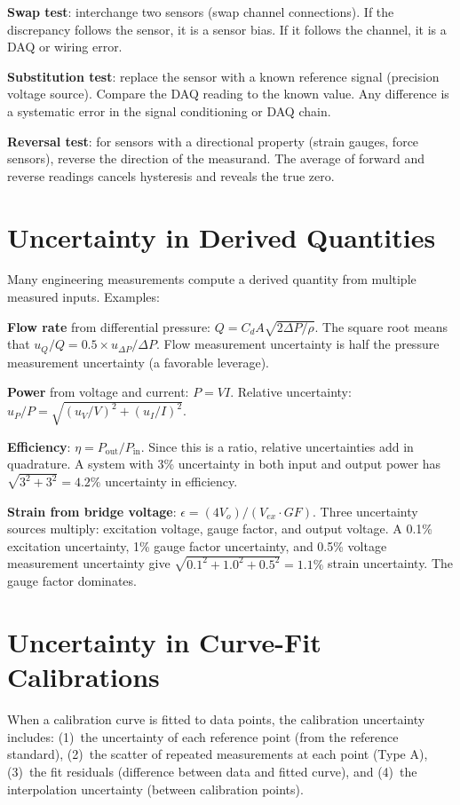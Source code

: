 \documentclass[11pt,letterpaper,twoside,openany]{book}
\begin{document}
\textbf{Swap test}: interchange two sensors (swap channel connections). If the discrepancy follows the sensor, it is a sensor bias. If it follows the channel, it is a DAQ or wiring error.

\textbf{Substitution test}: replace the sensor with a known reference signal (precision voltage source). Compare the DAQ reading to the known value. Any difference is a systematic error in the signal conditioning or DAQ chain.

\textbf{Reversal test}: for sensors with a directional property (strain gauges, force sensors), reverse the direction of the measurand. The average of forward and reverse readings cancels hysteresis and reveals the true zero.

\section{Uncertainty in Derived Quantities}
Many engineering measurements compute a derived quantity from multiple measured inputs. Examples:

\textbf{Flow rate} from differential pressure: $Q = C_d A \sqrt{2\Delta P/\rho}$. The square root means that $u_Q/Q = 0.5 \times u_{\Delta P}/\Delta P$. Flow measurement uncertainty is half the pressure measurement uncertainty (a favorable leverage).

\textbf{Power} from voltage and current: $P = VI$. Relative uncertainty: $u_P/P = \sqrt{(u_V/V)^2 + (u_I/I)^2}$.

\textbf{Efficiency}: $\eta = P_{\text{out}}/P_{\text{in}}$. Since this is a ratio, relative uncertainties add in quadrature. A system with 3\% uncertainty in both input and output power has $\sqrt{3^2 + 3^2} = 4.2\%$ uncertainty in efficiency.

\textbf{Strain from bridge voltage}: $\epsilon = (4V_o)/(V_{ex} \cdot GF)$. Three uncertainty sources multiply: excitation voltage, gauge factor, and output voltage. A 0.1\% excitation uncertainty, 1\% gauge factor uncertainty, and 0.5\% voltage measurement uncertainty give $\sqrt{0.1^2 + 1.0^2 + 0.5^2} = 1.1\%$ strain uncertainty. The gauge factor dominates.
\section{Uncertainty in Curve-Fit Calibrations}
When a calibration curve is fitted to data points, the calibration uncertainty includes: (1)~the uncertainty of each reference point (from the reference standard), (2)~the scatter of repeated measurements at each point (Type A), (3)~the fit residuals (difference between data and fitted curve), and (4)~the interpolation uncertainty (between calibration points).
\end{document}
